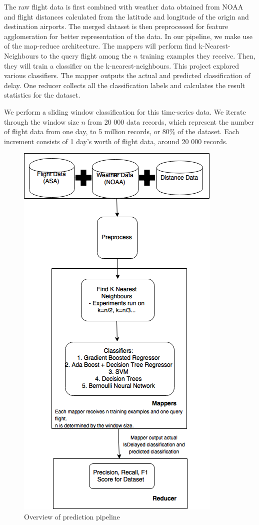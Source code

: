 \documentclass[letterpaper,11pt]{article}
\begin{document}
The raw flight data is first combined with weather data obtained from NOAA and flight distances calculated from the latitude and longitude of the origin and destination airports. The merged dataset is then preprocessed for feature agglomeration for better representation of the data. In our pipeline, we make use of the map-reduce architecture. The mappers will perform find k-Nearest-Neighbours to the query flight among the $n$ training examples they receive. Then, they will train a classifier on the k-nearest-neighbours. This project explored various classifiers. The mapper outputs the actual and predicted classification of delay. One reducer collects all the classification labels and calculates the result statistics for the dataset. 

We perform a sliding window classification for this time-series data. We iterate through the window size $n$ from 20 000 data records, which represent the number of flight data from one day, to 5 million records, or 80\% of the dataset. Each increment consists of 1 day's worth of flight data, around 20 000 records. 

\begin{figure}[htb]
\centering
\includegraphics[height=1.3\linewidth]{CS5228-final2.png}
\caption{Overview of prediction pipeline}
\label{fig:overview}
\end{figure}
\end{document}
